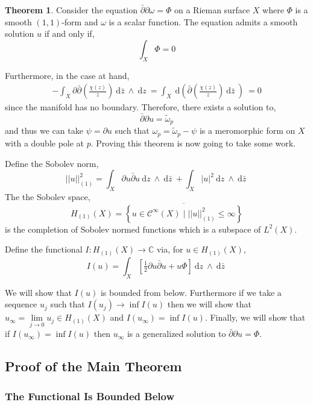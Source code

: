 \documentclass[12pt]{extarticle}
\newcommand{\C}{\mathbb{C}}
\renewcommand{\d}[1]{\: \mathrm{d}#1 \:}
\theoremstyle{definition}
\newtheorem{theorem}{Theorem}[section]
\newenvironment{definition}[1][Definition:]{\begin{trivlist}
\item[\hskip \labelsep {\bfseries #1}]}{\end{trivlist}}
\newcommand{\Class}[2]{\mathcal{C}^{#1} \left( #2 \right)}
\begin{document}
\begin{theorem}
Consider the equation $\bar{\partial} \partial \omega = \Phi$ on a Rieman surface $X$ where $\Phi$ is a smooth $(1, 1)$-form and $\omega$ is a scalar function. The equation admits a smooth solution $u$ if and only if,
\[ \int_X \Phi = 0 \]
\end{theorem}
Furthermore, in the case at hand,
\begin{align*}
-\int_X \partial \bar{\partial} \left( \frac{\chi(z)}{z} \right) \d{\bar{z}} \wedge \d{z} = \int_X \d{\left( \bar{\partial} \left( \frac{\chi(z)}{z} \right) \d{\bar{z}}\right)} = 0
\end{align*}
since the manifold has no boundary. Therefore, there exists a solution to,
\[ \bar{\partial} \partial u = \tilde{\omega}_p \]
and thus we can take $\psi = \partial u$ such that $\omega_p = \tilde{\omega}_p - \psi$ is a meromorphic form on $X$ with a double pole at $p$. Proving this theorem is now going to take some work.
\begin{definition}
Define the Sobolev norm,
\[ ||u||_{(1)}^2 = \int_X \partial u \bar{\partial} u \d{z} \wedge \d{\bar{z}} + \int_X |u|^2 \d{z} \wedge \d{\bar{z}} \]
The the Sobolev space,
\[ H_{(1)}(X) = \overline{ \left\{ u \in \Class{\infty}{X} \mid ||u||^2_{(1)} \le \infty \right\} } \]
is the completion of Sobolev normed functions which is a subspace of $L^2(X)$. 
\end{definition}

\begin{definition}
Define the functional $I : H_{(1)}(X) \to \C$ via, for $u \in H_{(1)}(X)$,
\[ I(u) = \int_X \left[ \tfrac{1}{2} \partial u \bar{\partial} u + u \Phi \right] \d{z} \wedge \d{\bar{z}} \]
\end{definition}
We will show that $I(u)$ is bounded from below. Furthermore if we take a sequence $u_j$ such that $I(u_j) \to \inf I(u)$ then we will show that $u_{\infty} = \lim\limits_{j \to 0} u_j \in H_{(1)}(X)$ and $I(u_{\infty}) =  \inf I(u)$. Finally, we will show that if $I(u_{\infty}) = \inf I(u)$ then $u_{\infty}$ is a generalized solution to $\bar{\partial} \partial u = \Phi$.  

\subsection{Proof of the Main Theorem}

\subsubsection{The Functional Is Bounded Below}
\end{document}
